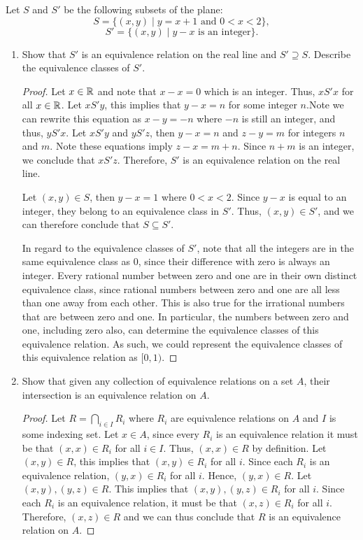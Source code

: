 \documentclass[12pt]{article}
\begin{document}
 Let $S$ and $S'$ be the following subsets of the plane:
$$
S = \{(x, y) \mid y = x + 1 \text{ and } 0 < x < 2\},
$$
$$
S' = \{(x, y) \mid y - x \text{ is an integer}\}.
$$
\begin{enumerate}[label=(\alph*)]
	\item Show that $S'$ is an equivalence relation on the real line and $S' \supseteq S$.
	Describe the equivalence classes of $S'$.
	
	\begin{proof}
		Let $x \in \mathbb{R}$ and note that $x - x = 0$ which is an integer. Thus, $xS'x$ for all
		$x \in \mathbb{R}$. Let $xS'y$, this implies that $y - x = n$ for some integer $n$.Note
		we can rewrite this equation as $x - y = -n$ where $-n$ is still an integer, and thus,
		$yS'x$. Let $xS'y$ and $yS'z$, then $y - x = n$ and $z - y = m$ for integers $n$ and $m$.
		Note these equations imply $z - x = m + n$. Since $n + m$ is an integer, we conclude that 
		$xS'z$. Therefore, $S'$ is an equivalence relation on the real line.
		
		Let $(x, y) \in S$, then $y - x = 1$ where $0 < x <2$. Since $y - x$ is equal to an
		integer, they belong to an equivalence class in $S'$. Thus, $(x, y) \in S'$, and we 
		can therefore conclude that $S \subseteq S'$. 
		
		In regard to the equivalence classes of $S'$, note that all the integers are in the 
		same equivalence class as $0$, since their difference with zero is always an integer. 
		Every rational number between zero and one are in their own distinct equivalence class,
		since rational numbers between zero and one are all less than one away from each other.
		This is also true for the irrational numbers that are between zero and one. In particular,
		the numbers between zero and one, including zero also, can determine the equivalence classes
		of this equivalence relation. As such, we could represent the equivalence classes of 
		this equivalence relation as $[0,1)$. 
	\end{proof}
	
	\item Show that given any collection of equivalence relations on a set $A$, their 
	intersection is an equivalence relation on $A$.
	
	\begin{proof}
		Let $R = \bigcap_{i \in I} R_i$ where $R_i$ are equivalence relations on $A$ and 
		$I$ is some indexing set. Let $x \in A$, since every $R_i$ is an equivalence relation
		it must be that $(x, x) \in R_i$ for all $i \in I$. Thus, $(x, x) \in R$ by definition.
		Let $(x, y) \in R$, this implies that $(x, y) \in R_i$ for all $i$. Since each $R_i$
		is an equivalence relation, $(y, x) \in R_i$ for all $i$. Hence, $(y, x) \in R$.
		Let $(x, y), (y, z) \in R$. This implies that $(x, y), (y, z) \in R_i$ for all $i$.
		Since each $R_i$ is an equivalence relation, it must be that $(x, z) \in R_i$ for all $i$.
		Therefore, $(x, z) \in R$ and we can thus conclude that $R$ is an equivalence relation on
		$A$.
	\end{proof}
	

\end{enumerate}
\end{document}
